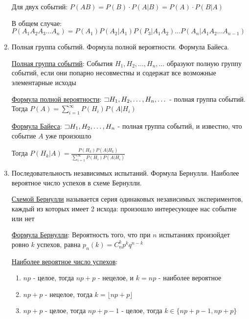 \documentclass[12pt]{article}
\begin{document}
\begin{enumerate}
    Для двух событий: $P(AB) = P(B) \cdot P(A|B) = P(A) \cdot P(B|A)$

    В общем случае: $P(A_1 A_2 A_3 \dots A_n) = P(A_1) P(A_2 | A_1) P(P_3 | A_1 A_2) \dots P(A_n | A_1 A_2 \dots A_{n - 1})$

    \item Полная группа событий. Формула полной вероятности. Формула Байеса.

    \hyperlink{completegroupofevents}{Полная группа событий}: События $H_1, H_2, \dots, H_n, \dots$ образуют полную группу событий, если они попарно несовместны и содержат все возможные элементарные исходы

    \hyperlink{formulaofcompleteprobability}{Формула полной вероятности}: $\mathord{\sqsupset} H_1, H_2, \dots, H_n, \dots$ - полная группа событий. Тогда $P(A) = \sum_{i = 1}^\infty P(H_i) P(A | H_i)$
    
    \hyperlink{bayesformula}{Формула Байеса}: $\mathord{\sqsupset} H_1, H_2, \dots, H_n$ - полная группа событий, и известно, что событие $A$ уже произошло

    Тогда $P(H_k | A) = \frac{P(H_k) P(A | H_k)}{\sum_{i = 1}^\infty P(H_i) P(A | H_i)}$

    \item Последовательность независимых испытаний. Формула Бернулли. Наиболее вероятное число успехов в схеме Бернулли.

    \hyperlink{bernoullischema}{Схемой Бернулли} называется серия одинаковых независимых экспериментов, каждый из которых имеет 2 исхода: произошло интересующее нас событие или нет

    \hyperlink{bernoulliformula}{Формула Бернулли}: Вероятность того, что при $n$ испытаниях произойдет ровно $k$ успехов, равна
    $p_n(k) = C_n^k p^k q^{n - k}$

    \hyperlink{themostprobablenumberofsuccesses}{Наиболее вероятное число успехов}: 

    \begin{enumerate}
        \item $np$ - целое, тогда $np + p$ - нецелое, и $k = np$ - наиболее вероятное

        \item $np + p$ - нецелое, тогда $k = \lfloor np + p \rfloor$

        \item $np + p$ - целое, тогда $np + p - 1$ - целое, тогда $k \in \{np + p - 1, np + p\}$
    \end{enumerate}


\end{enumerate}
\end{document}
